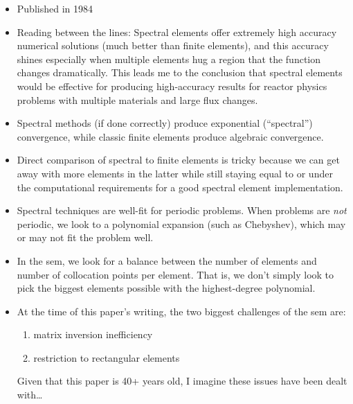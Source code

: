 \begin{itemize}
  \item Published in 1984
  \item Reading between the lines: Spectral elements offer extremely high accuracy numerical solutions (much better than finite elements), and this accuracy shines especially when multiple elements hug a region that the function changes dramatically. This leads me to the conclusion that spectral elements would be effective for producing high-accuracy results for reactor physics problems with multiple materials and large flux changes.
  \item Spectral methods (if done correctly) produce exponential (``spectral'') convergence, while classic finite elements produce algebraic convergence.
  \item Direct comparison of spectral to finite elements is tricky because we can get away with more elements in the latter while still staying equal to or under the computational requirements for a good spectral element implementation.
  \item Spectral techniques are well-fit for periodic problems. When problems are \textit{not} periodic, we look to a polynomial expansion (such as Chebyshev), which may or may not fit the problem well. 
  \item In the \gls{sem}, we look for a balance between the number of elements and number of collocation points per element. That is, we don't simply look to pick the biggest elements possible with the highest-degree polynomial.
  \item At the time of this paper's writing, the two biggest challenges of the \gls{sem} are:
        \begin{enumerate}
          \item matrix inversion inefficiency
          \item restriction to rectangular elements
        \end{enumerate}
        Given that this paper is 40+ years old, I imagine these issues have been dealt with\ldots
\end{itemize}